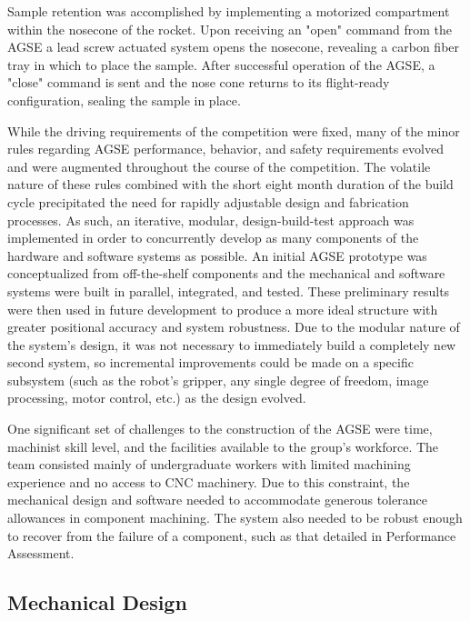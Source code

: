 Sample retention was accomplished by implementing a motorized compartment within the nosecone of the rocket.  Upon receiving an "open" command from the AGSE a lead screw actuated system opens the nosecone, revealing a carbon fiber tray in which to place the sample. After successful operation of the AGSE, a "close" command is sent and the nose cone returns to its flight-ready configuration, sealing the sample in place.

While the driving requirements of the competition were fixed, many of the minor rules regarding AGSE performance, behavior, and safety requirements evolved and were augmented throughout the course of the competition. The volatile nature of these rules combined with the short eight month duration of the build cycle precipitated the need for rapidly adjustable design and fabrication processes. As such, an iterative, modular, design-build-test approach was implemented in order to concurrently develop as many components of the hardware and software systems as possible. An initial AGSE prototype was conceptualized from off-the-shelf components and the mechanical and software systems were built in parallel, integrated, and tested. These preliminary results were then used in future development to produce a more ideal structure with greater positional accuracy and system robustness.  Due to the modular nature of the system's design, it was not necessary to immediately build a completely new second system, so incremental improvements could be made on a specific subsystem (such as the robot's gripper, any single degree of freedom, image processing, motor control, etc.) as the design evolved.

One significant set of challenges to the construction of the AGSE were time, machinist skill level, and the facilities available to the group's workforce. The team consisted mainly of undergraduate workers with limited machining experience and no access to CNC machinery.  Due to this constraint, the mechanical design and software needed to accommodate generous tolerance allowances in component machining. The system also needed to be robust enough to recover from the failure of a component, such as that detailed in Performance Assessment.



\subsection{Mechanical Design}


